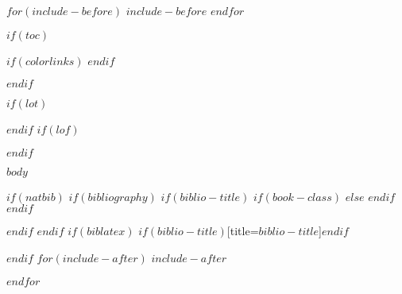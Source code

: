 \documentclass[11pt, a4paper, titlepage, twoside, openright, draft]{memoir}
\begin{document}
\frontmatter

$for(include-before)$
$include-before$
$endfor$


%
%
\thispagestyle{empty}
\vspace*{0em}
\noindent\hspace*{\centeroffset}
\pagebreak

$if(toc)$
{
$if(colorlinks)$
\hypersetup{linkcolor=$if(toccolor)$$toccolor$$else$$endif$}
$endif$
\cleardoublepage
\begin{KeepFromToc} %
  \tableofcontents
\end{KeepFromToc}
\pagebreak
\cleardoublepage
}
$endif$

$if(lot)$
\listoftables
$endif$
$if(lof)$
\listoffigures
$endif$


\mainmatter
$body$

\appendix

\backmatter

$if(natbib)$
$if(bibliography)$
$if(biblio-title)$
$if(book-class)$
\renewcommand\bibname{$biblio-title$}
$else$
\renewcommand\refname{$biblio-title$}
$endif$
$endif$


$endif$
$endif$
$if(biblatex)$
\printbibliography$if(biblio-title)$[title=$biblio-title$]$endif$

$endif$
$for(include-after)$
$include-after$

\printindex

$endfor$
\end{document}

